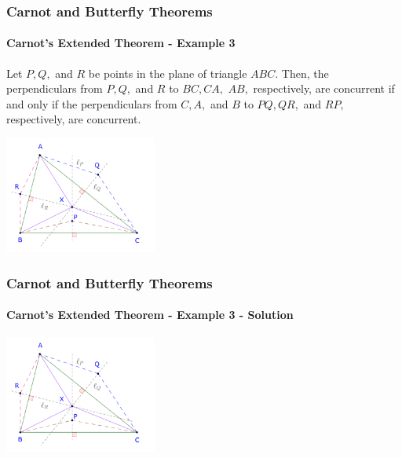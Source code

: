 \documentclass[8pt,xcolor=table,dvipsnames]{beamer}
\begin{document}
\begin{frame}[t]
    \frametitle{Carnot and Butterfly Theorems}
    \framesubtitle{Carnot's Extended Theorem - Example 3}
    \begin{example}
        Let $P, Q,$ and $R$ be points in the plane of triangle $ABC.$
        Then, the perpendiculars from $P, Q,$ and $R$ to $BC, CA,$ $AB,$ respectively, are concurrent if and only if
        the perpendiculars from $C, A,$ and $B$ to $PQ, QR,$ and $RP,$ respectively, are concurrent.
    \end{example}

    \bigbreak
    \begin{center}
        \includegraphics[width=5cm]{./svg/pdf/24-25-s7-g3-p1.pdf}
    \end{center}
\end{frame}

\begin{frame}[t]
    \frametitle{Carnot and Butterfly Theorems}
    \framesubtitle{Carnot's Extended Theorem - Example 3 - Solution}
    \begin{center}
        \includegraphics[width=5cm]{./svg/pdf/24-25-s7-g3-p1.pdf}
    \end{center}
    

\end{frame}
\end{document}
